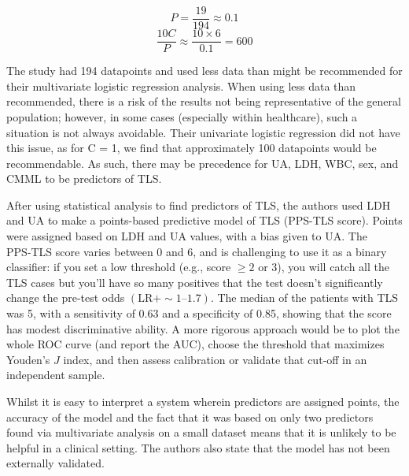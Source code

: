 \documentclass{article}
\begin{document}
\[P = \frac{19}{194} \approx 0.1 \]
\[\frac{10C}{P} \approx \frac{10 \times 6}{0.1} = 600\]

The study had 194 datapoints and used less data than might be recommended for their multivariate logistic regression analysis. When using less data than recommended, there is a risk of the results not being representative of the general population; however, in some cases (especially within healthcare), such a situation is not always avoidable. Their univariate logistic regression did not have this issue, as for C = 1, we find that approximately 100 datapoints would be recommendable. As such, there may be precedence for UA, LDH, WBC,  sex, and CMML to be predictors of TLS.

After using statistical analysis to find predictors of TLS, the authors used LDH and UA to make a points-based predictive model of TLS (PPS-TLS score). Points were assigned based on LDH and UA values, with a bias given to UA. The PPS‑TLS score varies between 0 and 6, and is challenging to use it as a binary classifier: if you set a low threshold (e.g., score \(\ge 2\) or 3), you will catch all the TLS cases but you’ll have so many positives that the test doesn’t significantly change the pre‑test odds \((\mathrm{LR}+ \sim1 \text{--}1.7)\). The median of the patients with TLS was 5, with a sensitivity of 0.63 and a specificity of 0.85, showing that the score has modest discriminative ability. 
A more rigorous approach would be to plot the whole ROC curve (and report the AUC), choose the threshold that maximizes Youden’s \(J\) index, and then assess calibration or validate that cut‑off in an independent sample.

Whilst it is easy to interpret a system wherein predictors are assigned points, the accuracy of the model and the fact that it was based on only two predictors found via multivariate analysis on a small dataset means that it is unlikely to be helpful in a clinical setting. The authors also state that the model has not been externally validated. 
\end{document}
